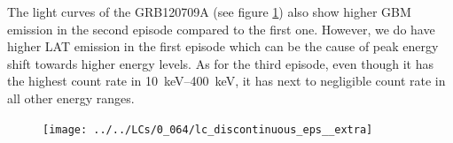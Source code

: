 \documentclass[10pt,report]{article}
\begin{document}
	The light curves of the GRB120709A (see figure \ref{fig:lcdiscontinuousepsextra}) also show higher GBM emission in the second episode compared to the first one. However, we do have higher LAT emission in the first episode which can be the cause of peak energy shift towards higher energy levels. As for the third episode, even though it has the highest count rate in \SIrange{10}{400}{\kilo\electronvolt}, it has next to negligible count rate in all other energy ranges. 
	\begin{figure}[!h]
		\centering%
		\texttt{[image: ../../LCs/0\_064/lc\_discontinuous\_eps\_\_extra]}%
		\label{fig:lcdiscontinuousepsextra}%
	\end{figure}
	
\end{document}

